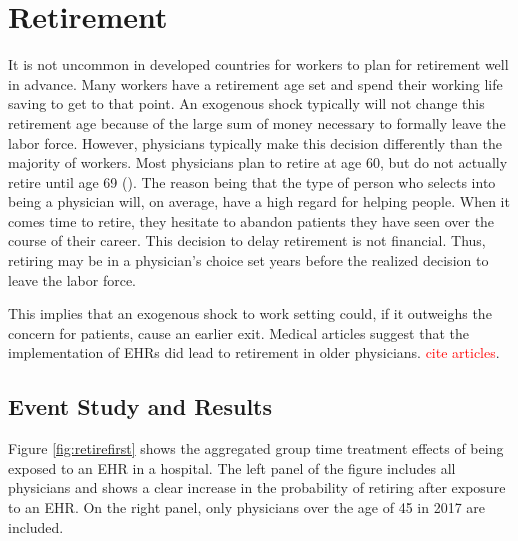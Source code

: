 \documentclass[11pt]{article}
\begin{document}
\newpage

\section{Retirement}

It is not uncommon in developed countries for workers to plan for retirement well in advance. Many workers have a retirement age set and spend their working life saving to get to that point. An exogenous shock typically will not change this retirement age because of the large sum of money necessary to formally leave the labor force. However, physicians typically make this decision differently than the majority of workers. Most physicians plan to retire at age 60, but do not actually retire until age 69 (\cite{collier2017challenges}). The reason being that the type of person who selects into being a physician will, on average, have a high regard for helping people. When it comes time to retire, they hesitate to abandon patients they have seen over the course of their career. This decision to delay retirement is not financial. Thus, retiring may be in a physician's choice set years before the realized decision to leave the labor force. 

This implies that an exogenous shock to work setting could, if it outweighs the concern for patients, cause an earlier exit. Medical articles suggest that the implementation of EHRs did lead to retirement in older physicians. \textcolor{red}{cite articles}. 

\subsection{Event Study and Results}

Figure \ref{fig:retirefirst} shows the aggregated group time treatment effects of being exposed to an EHR in a hospital. The left panel of the figure includes all physicians and shows a clear increase in the probability of retiring after exposure to an EHR. On the right panel, only physicians over the age of 45 in 2017 are included. 
\end{document}
